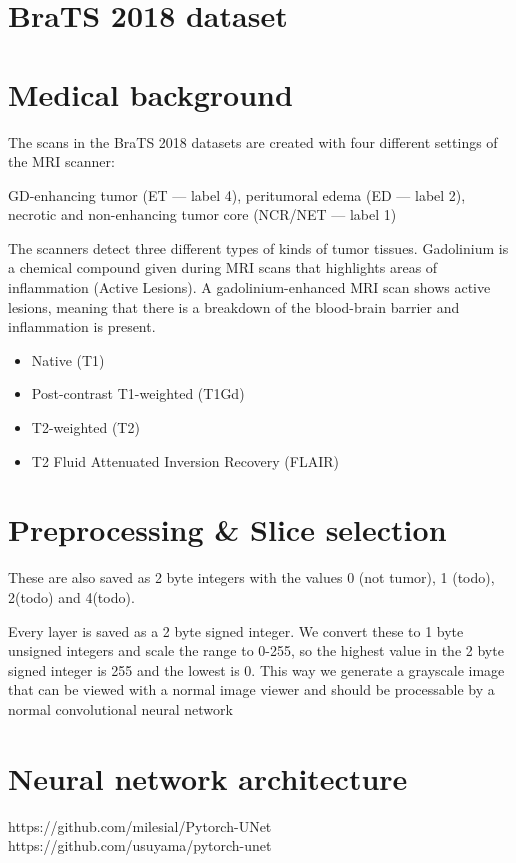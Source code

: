 \section{BraTS 2018 dataset}
\section{Medical background}
The scans in the BraTS 2018 datasets are created with four different settings of the MRI scanner:

GD-enhancing tumor (ET — label 4),
peritumoral edema (ED — label 2),
necrotic and non-enhancing tumor core (NCR/NET — label 1)


The scanners detect three different types of kinds of tumor tissues. 
Gadolinium is a chemical compound given during MRI scans that highlights areas of inflammation (Active Lesions). A gadolinium-enhanced  MRI scan shows active lesions, meaning that there is a breakdown of the blood-brain barrier and inflammation is present.


\begin{itemize}
    \item Native (T1)
    \item Post-contrast T1-weighted (T1Gd)
    \item T2-weighted (T2)
    \item T2 Fluid Attenuated Inversion Recovery (FLAIR)
\end{itemize}

\section{Preprocessing \& Slice selection}
These are also saved as 2 byte integers with the values 0 (not tumor), 1 (todo), 2(todo) and 4(todo).

Every layer is saved as a 2 byte signed integer. We convert these to 1 byte unsigned integers and scale the range to 0-255, so the highest value in the 2 byte signed integer is 255 and the lowest is 0.
This way we generate a grayscale image that can be viewed with a normal image viewer and should be processable by a normal convolutional neural network

\section{Neural network architecture}
https://github.com/milesial/Pytorch-UNet
https://github.com/usuyama/pytorch-unet

